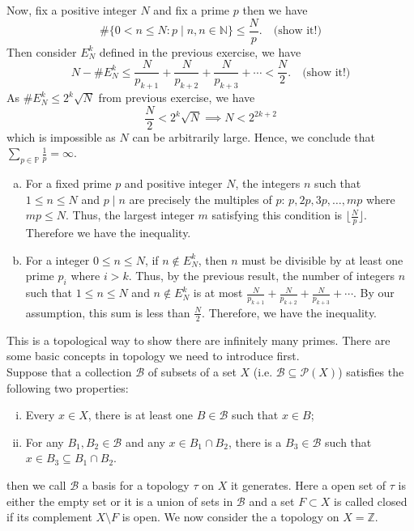 \documentclass{elegantbook}
\begin{document}
\begin{problemset}[Exercises]
    Now, fix a positive integer $N$ and fix a prime $p$ then we have
    \[
    \#\{0<n \leq N: p \mid n, n\in\mathbb{N}\} \leq \frac{N}{p}. \quad \text{(show it!)}
    \]
    Then consider $E^k_N$ defined in the previous exercise, we have
    \[
      N - \#E^k_N \leq \frac{N}{p_{k+1}} + \frac{N}{p_{k+2}} + \frac{N}{p_{k+3}} + \cdots < \frac{N}{2}. \quad \text{(show it!)}
    \]
    As $\#E^k_N \leq 2^k \sqrt{N}$ from previous exercise, we have
    \[
      \frac{N}{2} < 2^k \sqrt{N} \implies N < 2^{2k+2}
    \]
    which is impossible as $N$ can be arbitrarily large. Hence, we conclude that $\sum_{p \in \mathbb{P}} \frac{1}{p}=\infty$.
  \begin{solution}
    \begin{enumerate}[(a)]
      \item For a fixed prime $p$ and positive integer $N$, the integers $n$ such that $1 \leq n \leq N$ and $p \mid n$ are precisely the multiples of $p$: $p, 2p, 3p, \ldots, mp$ where $mp \leq N$. Thus, the largest integer $m$ satisfying this condition is $\lfloor \frac{N}{p} \rfloor$. Therefore we have the inequality.
      \item For a integer $0\leq n \leq N$, if $n \notin E^k_N$, then $n$ must be divisible by at least one prime $p_i$ where $i > k$. Thus, by the previous result, the number of integers $n$ such that $1 \leq n \leq N$ and $n \notin E^k_N$ is at most $\frac{N}{p_{k+1}} + \frac{N}{p_{k+2}} + \frac{N}{p_{k+3}} + \cdots$. By our assumption, this sum is less than $\frac{N}{2}$. Therefore, we have the inequality.
    \end{enumerate}
  \end{solution}
  \item This is a topological way to show there are infinitely many primes. There are some basic concepts in topology we need to introduce first. \\
  Suppose that a collection $\mathcal{B}$ of subsets of a set $X$ (i.e. $\mathcal{B} \subseteq \mathcal{P}(X)$) satisfies the following two properties: 
  \begin{enumerate}[(i)]
    \item Every $x \in X$, there is at least one $B \in \mathcal{B}$ such that $x \in B$; \label{ex:property_basis_1}
    \item For any $B_1, B_2 \in \mathcal{B}$ and any $x \in B_1 \cap B_2$, there is a $B_3 \in \mathcal{B}$ such that $x \in B_3 \subseteq B_1 \cap B_2$. \label{ex:property_basis_2}
  \end{enumerate}
  then we call $\mathcal{B}$ a basis for a topology $\tau$ on $X$ it generates. Here a open set of $\tau$ is either the empty set or it is a union of sets in $\mathcal{B}$ and a set $F\subset X$ is called closed if its complement $X\setminus F$ is open. We now consider the a topology on $X=\mathbb{Z}$.

\end{problemset}
\end{document}
